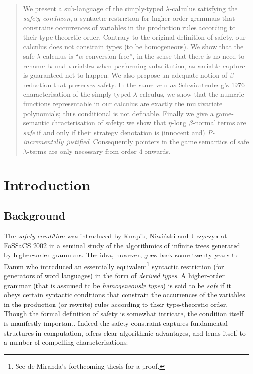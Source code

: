 \documentclass{llncs}
\begin{document}
\begin{abstract}
  We present a sub-language of the simply-typed $\lambda$-calculus
  satisfying the \emph{safety condition}, a syntactic restriction for
  higher-order grammars that constrains occurrences of variables in
  the production rules according to their type-theoretic order.
  Contrary to the original definition of safety, our calculus does not
  constrain types (to be homogeneous).  We show that the safe
  $\lambda$-calculus is ``$\alpha$-conversion free'', in the sense that
  there is no need to rename bound variables when performing
  substitution, as variable capture is guaranteed not to happen.  We
  also propose an adequate notion of $\beta$-reduction that preserves
  safety.  In the same vein as Schwichtenberg's 1976 characterisation
  of the simply-typed $\lambda$-calculus, we show that the numeric
  functions representable in our calculus are exactly the multivariate
  polynomials; thus conditional is not definable.  Finally we give a
  game-semantic chracterisation of safety: we show that $\eta$-long
  $\beta$-normal terms are \emph{safe} if and only if their strategy
  denotation is (innocent and) \emph{P-incrementally
    justified}. Consequently pointers in the game semantics of safe
  $\lambda$-terms are only necessary from order 4 onwards.
\end{abstract}

\section{Introduction}

\subsection*{Background}

The \emph{safety condition} was introduced by Knapik, Niwi{\'n}ski and
Urzyczyn at FoSSaCS 2002 \cite{KNU02} in a seminal study of the
algorithmics of infinite trees generated by higher-order grammars. The
idea, however, goes back some twenty years to Damm \cite{Dam82} who
introduced an essentially equivalent\footnote{See de Miranda's
  forthcoming thesis \cite{demirandathesis} for a proof.} syntactic
restriction (for generators of word languages) in the form of
\emph{derived types}.
A higher-order grammar (that is assumed to be \emph{homogeneously
  typed}) is said to be \emph{safe} if it obeys certain syntactic
conditions that constrain the occurrences of the variables in the
production (or rewrite) rules according to their type-theoretic
order. Though the formal definition of safety is somewhat intricate,
the condition itself is manifestly important. Indeed the safety
constraint captures fundamental structures in computation, offers
clear algorithmic advantages, and lends itself to a number of
compelling characterisations:
\end{document}
